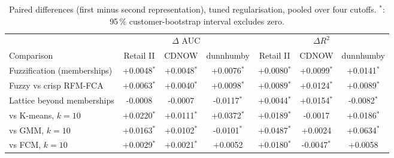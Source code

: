 \begin{table}[t]
\centering\small
\caption{Paired differences (first minus second representation), tuned regularisation, pooled over four cutoffs. $^{*}$: 95\,\% customer-bootstrap interval excludes zero.}
\label{tab:comparisons}
\begin{tabular}{lcccccc}
\toprule
 & \multicolumn{3}{c}{$\Delta$ AUC} & \multicolumn{3}{c}{$\Delta R^2$} \\
\cmidrule(lr){2-4}\cmidrule(lr){5-7}
Comparison & Retail II & CDNOW & dunnhumby & Retail II & CDNOW & dunnhumby \\
\midrule
Fuzzification (memberships) & +0.0048$^{*}$ & +0.0048$^{*}$ & +0.0076$^{*}$ & +0.0080$^{*}$ & +0.0099$^{*}$ & +0.0141$^{*}$ \\
Fuzzy vs crisp RFM-FCA & +0.0063$^{*}$ & +0.0040$^{*}$ & +0.0098$^{*}$ & +0.0089$^{*}$ & +0.0124$^{*}$ & +0.0089$^{*}$ \\
Lattice beyond memberships & -0.0008 & -0.0007 & -0.0117$^{*}$ & +0.0044$^{*}$ & +0.0154$^{*}$ & -0.0082$^{*}$ \\
vs K-means, $k{=}10$ & +0.0220$^{*}$ & +0.0111$^{*}$ & +0.0372$^{*}$ & +0.0189$^{*}$ & -0.0017 & +0.0186$^{*}$ \\
vs GMM, $k{=}10$ & +0.0163$^{*}$ & +0.0102$^{*}$ & -0.0101$^{*}$ & +0.0487$^{*}$ & +0.0024 & +0.0634$^{*}$ \\
vs FCM, $k{=}10$ & +0.0029$^{*}$ & +0.0021$^{*}$ & +0.0052 & +0.0180$^{*}$ & -0.0047$^{*}$ & +0.0058 \\
\bottomrule
\end{tabular}
\end{table}
